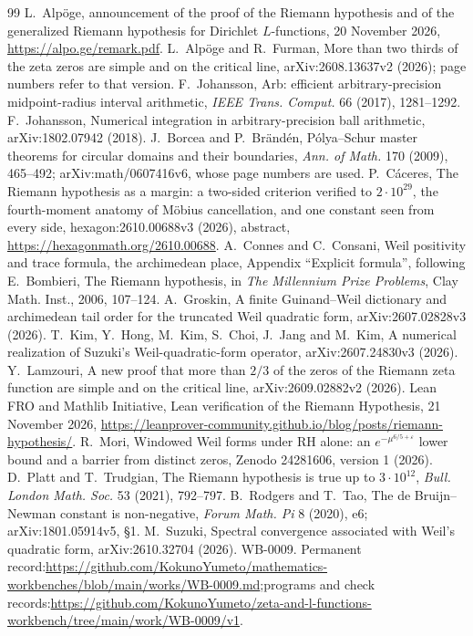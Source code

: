 \documentclass[11pt,a4paper]{article}
\theoremstyle{plain}
\theoremstyle{remark}
\newcommand{\workbenchurl}{https://github.com/KokunoYumeto/zeta-and-l-functions-workbench/tree/main/work/WB-0009/v1}
\newcommand{\recordurl}{https://github.com/KokunoYumeto/mathematics-workbenches/blob/main/works/WB-0009.md}
\begin{document}
\begin{thebibliography}{99}\small
{} L.~Alp\"oge, announcement of the proof of the Riemann hypothesis and of the generalized Riemann
hypothesis for Dirichlet $L$-functions, 20 November 2026, \url{https://alpo.ge/remark.pdf}.
 L.~Alp\"oge and R.~Furman, More than two thirds of the zeta zeros are simple and on the
critical line, arXiv:2608.13637v2 (2026); page numbers refer to that version.
 F.~Johansson, Arb: efficient arbitrary-precision midpoint-radius interval arithmetic, \emph{IEEE Trans.
Comput.} 66 (2017), 1281--1292.
 F.~Johansson, Numerical integration in arbitrary-precision ball arithmetic, arXiv:1802.07942
(2018).
 J.~Borcea and P.~Br\"and\'en, P\'olya--Schur master theorems for circular domains and their
boundaries, \emph{Ann. of Math.} 170 (2009), 465--492; arXiv:math/0607416v6, whose page numbers are used.
 P.~C\'aceres, The Riemann hypothesis as a margin: a two-sided criterion verified to $2\cdot10^{29}$,
the fourth-moment anatomy of M\"obius cancellation, and one constant seen from every side, hexagon:2610.00688v3
(2026), abstract, \url{https://hexagonmath.org/2610.00688}.
 A.~Connes and C.~Consani, Weil positivity and trace formula, the archimedean place, Appendix
``Explicit formula'', following E.~Bombieri, The Riemann hypothesis, in \emph{The Millennium Prize Problems}, Clay
Math. Inst., 2006, 107--124.
 A.~Groskin, A finite Guinand--Weil dictionary and archimedean tail order for the truncated Weil
quadratic form, arXiv:2607.02828v3 (2026).
 T.~Kim, Y.~Hong, M.~Kim, S.~Choi, J.~Jang and M.~Kim, A numerical realization of Suzuki's
Weil-quadratic-form operator, arXiv:2607.24830v3 (2026).
 Y.~Lamzouri, A new proof that more than $2/3$ of the zeros of the Riemann zeta function are simple
and on the critical line, arXiv:2609.02882v2 (2026).
 Lean FRO and Mathlib Initiative, Lean verification of the Riemann Hypothesis, 21 November 2026,
\url{https://leanprover-community.github.io/blog/posts/riemann-hypothesis/}.
 R.~Mori, Windowed Weil forms under RH alone: an $e^{-\mu^{6/5+\varepsilon}}$ lower bound and a barrier
from distinct zeros, Zenodo 24281606, version 1 (2026).
 D.~Platt and T.~Trudgian, The Riemann hypothesis is true up to $3\cdot10^{12}$, \emph{Bull.
London Math. Soc.} 53 (2021), 792--797.
 B.~Rodgers and T.~Tao, The de Bruijn--Newman constant is non-negative, \emph{Forum Math. Pi} 8
(2020), e6; arXiv:1801.05914v5, §1.
 M.~Suzuki, Spectral convergence associated with Weil's quadratic form, arXiv:2610.32704 (2026).
 WB-0009. Permanent record:\newline \expandafter\url\expandafter{\recordurl};\newline programs and
check records:\newline \expandafter\url\expandafter{\workbenchurl}.
\end{thebibliography}
\end{document}
